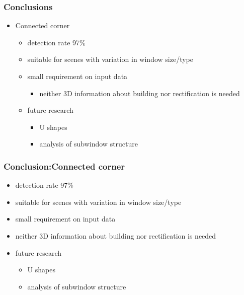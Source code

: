 \documentclass{beamer}
\begin{document}
\frame
{
	\frametitle{Conclusions}
	\begin{itemize}
	\item <+-| alert@+> Connected corner
		\begin{itemize}
		\item <+-| alert@+> detection rate 97\%
		\item <+-| alert@+> suitable for scenes with variation in window size/type
		\item <+-| alert@+> small requirement on input data
			\begin{itemize}
			\item <+-| alert@+> neither 3D information about building nor rectification is needed
			\end{itemize}
		\item <+-| alert@+> future research
			\begin{itemize}			
			\item <+-| alert@+> U shapes 
			\item <+-| alert@+> analysis of subwindow structure
			\end{itemize}			
		\end{itemize}
	\end{itemize}
}

\frame
{
}

\frame
{
}


\frame
{
	\frametitle{Conclusion:Connected corner}
	\begin{itemize}
	\item <+-| alert@+> detection rate 97\%
	\item <+-| alert@+> suitable for scenes with variation in window size/type
	\item <+-| alert@+> small requirement on input data
		\item <+-| alert@+> neither 3D information about building nor rectification is needed
	\item <+-| alert@+> future research
		\begin{itemize}			
		\item <+-| alert@+> U shapes 
		\item <+-| alert@+> analysis of subwindow structure
		\end{itemize}			
	\end{itemize}
}
\end{document}
